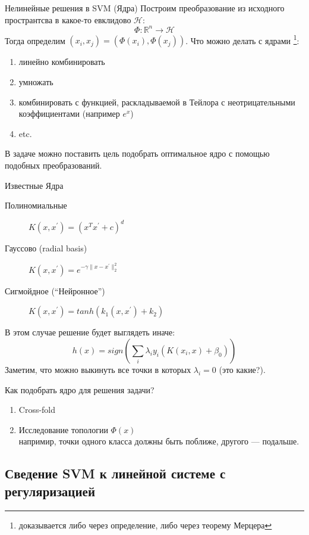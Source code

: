 \documentclass[14pt, fleqn, xcolor={dvipsnames, table}]{beamer}
\begin{document}
\begin{frame}{Нелинейные решения в SVM (Ядра)}
\small
Построим преобразование из исходного пространтсва в какое-то евклидово $\mathcal{H}$:
$$
\Phi: \mathbb{R}^n \to \mathcal{H}
$$
Тогда определим $(x_i, x_j) = (\Phi(x_i), \Phi(x_j))$. Что можно делать с ядрами \footnote{доказывается либо через определение, либо через теорему Мерцера}:
\begin{enumerate}
\footnotesize
  \item линейно комбинировать
  \item умножать
  \item комбинировать с функцией, раскладываемой в Тейлора с неотрицательными коэффициентами (например $e^x$)
  \item etc.
\end{enumerate}
В задаче можно поставить цель подобрать оптимальное ядро с помощью подобных преобразований.
\end{frame}

\begin{frame}{Известные Ядра}
\small
\begin{description}
  \item[Полиномиальные] $K(x,x^{'}) = (x^Tx^{'} + c)^d$ 
  \item[Гауссово (radial basis)] $K(x,x^{'}) = e^{-\gamma \|x - x^{'}\|_2^2}$ 
  \item[Сигмойдное (``Нейронное'')] $K(x,x^{'}) = tanh(k_1 (x,x^{'}) + k_2)$ 
\end{description}
В этом случае решение будет выглядеть иначе:
$$
h(x) = sign \left(\sum_i \lambda_i y_i (K(x_i, x) + \beta_0)\right)
$$
Заметим, что можно выкинуть все точки в которых $\lambda_i = 0$ (это какие?).
\end{frame}

\begin{frame}{Как подобрать ядро для решения задачи?}
\begin{enumerate}
\item Cross-fold
\item Исследование топологии $\Phi(x)$ \\
\small напримир, точки одного класса должны быть поближе, другого --- подальше.
\end{enumerate}
\end{frame}

\subsection{Сведение SVM к линейной системе с регуляризацией} %
\end{document}
